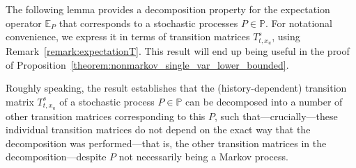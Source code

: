 \documentclass[10pt,a4paper]{paper}
\theoremstyle{definition}
\newcommand{\reals}{\mathbb{R}}
\newcommand{\realspos}{\reals_{>0}}
\newcommand{\processes}{\mathbb{P}}
\newcommand{\coloneqq}{:\!=}
\begin{document}


The following lemma provides a decomposition property for the expectation operator $\mathbb{E}_P$ that corresponds to a stochastic processes $P\in\processes$. For notational convenience, we express it in terms of transition matrices $T_{t,x_u}^s$, using Remark~\ref{remark:expectationT}. This result will end up being useful in the proof of Proposition~\ref{theorem:nonmarkov_single_var_lower_bounded}.

Roughly speaking, the result establishes that the (history-dependent) transition matrix $T_{t,x_u}^s$ of a stochastic process $P\in\processes$ can be decomposed into a number of other transition matrices corresponding to this $P$, such that---crucially---these individual transition matrices do not depend on the exact way that the decomposition was performed---that is, the other transition matrices in the decomposition---despite $P$ not necessarily being a Markov process.
\end{document}

